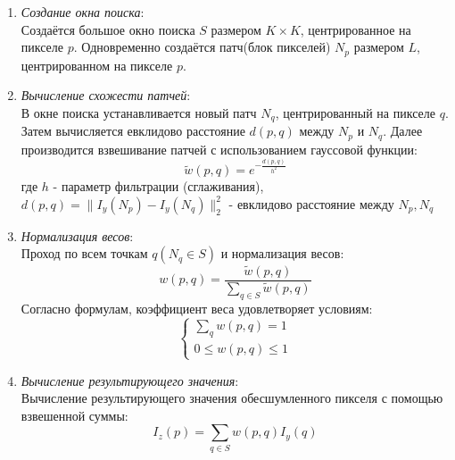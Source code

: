 \begin{enumerate}[]
	\item \textit{Создание окна поиска}:\\
	Создаётся большое окно поиска $S$ размером $K \times K$, центрированное на пикселе $p$. Одновременно создаётся патч(блок пикселей) $N_p$ размером $L$, центрированном на пикселе $p$.
	\item \textit{Вычисление схожести патчей}:\\
	В окне поиска устанавливается новый патч $N_q$, центрированный на пикселе $q$. Затем вычисляется евклидово расстояние $d(p,q)$ между $N_p$ и $N_q$. Далее производится взвешивание патчей с использованием гауссовой функции:
	\begin{equation}
		\tilde w(p,q) = e^{-\frac{d(p,q)}{h^2}}
	\end{equation}
	где $h$ - параметр фильтрации (сглаживания),\\
	$d(p,q) = \|I_y(N_p) - I_y(N_q)\|^2_2$ - евклидово расстояние между $N_p, N_q$
	\item \textit{Нормализация весов}:\\
	Проход по всем точкам $q (N_q \in S)$ и нормализация весов:
	 \begin{equation}
		w(p,q) = \frac{\tilde w(p,q)}{\sum_{q \in S} \tilde w(p,q)} 
	\end{equation}
	Согласно формулам, коэффициент веса удовлетворяет условиям:
	\begin{equation}
		\left\{ 
		\begin{array}{ll} 
			\sum_{q} w(p,q) = 1\\
			0 \leq w(p,q) \leq 1 \end{array}\right.
	\end{equation}	
	\item \textit{Вычисление результирующего значения}:\\
	Вычисление результирующего значения обесшумленного пикселя с помощью взвешенной суммы:
	\begin{equation}
		I_z(p) = \sum_{q \in S}w(p,q)I_y(q)
	\end{equation}
\end{enumerate}

